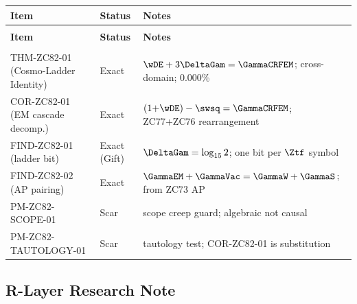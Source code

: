 \documentclass[12pt, a4paper]{article}
\begin{document}
{\small
\setlength{\LTpre}{4pt}\setlength{\LTpost}{4pt}
\renewcommand{\arraystretch}{1.30}
\begin{longtable}{>{\raggedright\arraybackslash}p{5.2cm}
                  >{\centering\arraybackslash}p{2.4cm}
                  >{\raggedright\arraybackslash}p{5.0cm}}
\toprule
\textbf{Item} & \textbf{Status} & \textbf{Notes} \\
\midrule
\endfirsthead
\multicolumn{3}{l}{\small\textit{(continued)}}\\[4pt]
\toprule\textbf{Item}&\textbf{Status}&\textbf{Notes}\\\midrule
\endhead
\midrule\multicolumn{3}{r}{\small\textit{(continues)}}\\
\endfoot
\bottomrule
\endlastfoot
THM-ZC82-01 (Cosmo-Ladder Identity)
  & Exact & $\wDE+3\DeltaGam=\GammaCRFEM$; cross-domain; 0.000\% \\[4pt]
COR-ZC82-01 (EM cascade decomp.)
  & Exact & $(1{+}\wDE)-\swsq=\GammaCRFEM$; ZC77+ZC76 rearrangement \\[4pt]
FIND-ZC82-01 (ladder bit)
  & Exact (Gift) & $\DeltaGam=\log_{15}2$; one bit per $\Ztf$ symbol \\[4pt]
FIND-ZC82-02 (AP pairing)
  & Exact & $\GammaEM+\GammaVac=\GammaW+\GammaS$; from ZC73 AP \\[4pt]
PM-ZC82-SCOPE-01
  & Scar & scope creep guard; algebraic not causal \\[4pt]
PM-ZC82-TAUTOLOGY-01
  & Scar & tautology test; COR-ZC82-01 is substitution \\[4pt]
\bottomrule
\end{longtable}
}

\subsection{R-Layer Research Note}
\label{sec:rlayer}
\end{document}
